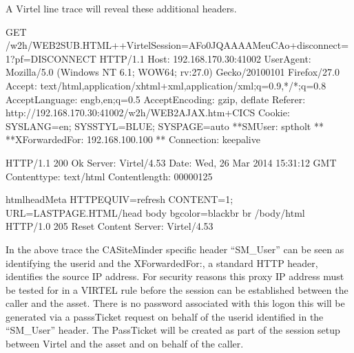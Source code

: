 \documentclass[letterpaper,10pt,english]{sphinxmanual}
\begin{document}
\sphinxAtStartPar
A Virtel line trace will reveal these additional headers.

\begin{sphinxVerbatim}[commandchars=\\\{\}]
GET /w2h/WEB2SUB.HTML++VirtelSession=AFo0JQAAAAMeuCAo+disconnect=1?pf=DISCONNECT HTTP/1.1
Host: 192.168.170.30:41002
User\PYGZhy{}Agent: Mozilla/5.0 (Windows NT 6.1; WOW64; rv:27.0) Gecko/20100101 Firefox/27.0
Accept: text/html,application/xhtml+xml,application/xml;q=0.9,\PYGZbs{}*/\PYGZbs{}*;q=0.8
Accept\PYGZhy{}Language: en\PYGZhy{}gb,en;q=0.5
Accept\PYGZhy{}Encoding: gzip, deflate
Referer: http://192.168.170.30:41002/w2h/WEB2AJAX.htm+CICS
Cookie: SYSLANG=en; SYSSTYL=BLUE; SYSPAGE=auto
**SM\PYGZus{}User: sptholt \PYGZlt{}\PYGZlt{}**
**X\PYGZhy{}Forwarded\PYGZhy{}For: 192.168.100.100 \PYGZlt{}\PYGZlt{}**
Connection: keep\PYGZhy{}alive

HTTP/1.1 200 Ok
Server: Virtel/4.53
Date: Wed, 26 Mar 2014 15:31:12 GMT
Content\PYGZhy{}type: text/html
Content\PYGZhy{}length: 00000125

\PYGZlt{}html\PYGZgt{}\PYGZlt{}head\PYGZgt{}\PYGZlt{}Meta HTTP\PYGZhy{}EQUIV=\PYGZdq{}refresh\PYGZdq{} CONTENT=\PYGZdq{}1; URL=LASTPAGE.HTML\PYGZdq{}\PYGZgt{}\PYGZlt{}/head\PYGZgt{}
\PYGZlt{}body bgcolor=\PYGZdq{}black\PYGZdq{}\PYGZgt{}\PYGZlt{}br\PYGZgt{}
\PYGZlt{}br\PYGZgt{}
\PYGZlt{}/body\PYGZgt{}\PYGZlt{}/html\PYGZgt{}
HTTP/1.0 205 Reset Content
Server: Virtel/4.53
\end{sphinxVerbatim}

\sphinxAtStartPar
In the above trace the CA\sphinxhyphen{}SiteMinder specific header “SM\_User” can be seen as identifying the userid and the X\sphinxhyphen{}Forwarded\sphinxhyphen{}For:, a standard HTTP header, identifies the source IP address. For security reasons this proxy IP address must be tested for in a VIRTEL rule before the session can be established between the caller and the asset. There is no password associated with this logon \textendash{} this will be generated via a passsTicket request on behalf of the userid identified in the “SM\_User” header. The PassTicket will be created as part of the session setup between Virtel and the asset and on behalf of the caller.

\newpage

\ignorespaces 
\end{document}
